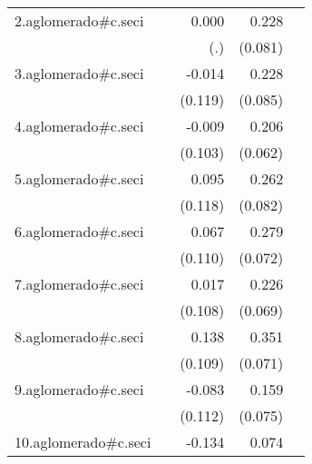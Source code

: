 {\begin{longtable}{l*{4}{D{.}{.}{-1}}}
\addlinespace
2.aglomerado#c.seci&                     &       0.000         &       0.228\sym{**} &                     \\
            &                     &         (.)         &     (0.081)         &                     \\
\addlinespace
3.aglomerado#c.seci&                     &      -0.014         &       0.228\sym{**} &                     \\
            &                     &     (0.119)         &     (0.085)         &                     \\
\addlinespace
4.aglomerado#c.seci&                     &      -0.009         &       0.206\sym{***}&                     \\
            &                     &     (0.103)         &     (0.062)         &                     \\
\addlinespace
5.aglomerado#c.seci&                     &       0.095         &       0.262\sym{**} &                     \\
            &                     &     (0.118)         &     (0.082)         &                     \\
\addlinespace
6.aglomerado#c.seci&                     &       0.067         &       0.279\sym{***}&                     \\
            &                     &     (0.110)         &     (0.072)         &                     \\
\addlinespace
7.aglomerado#c.seci&                     &       0.017         &       0.226\sym{**} &                     \\
            &                     &     (0.108)         &     (0.069)         &                     \\
\addlinespace
8.aglomerado#c.seci&                     &       0.138         &       0.351\sym{***}&                     \\
            &                     &     (0.109)         &     (0.071)         &                     \\
\addlinespace
9.aglomerado#c.seci&                     &      -0.083         &       0.159\sym{*}  &                     \\
            &                     &     (0.112)         &     (0.075)         &                     \\
\addlinespace
10.aglomerado#c.seci&                     &      -0.134         &       0.074         &                     \\

\end{longtable}}

